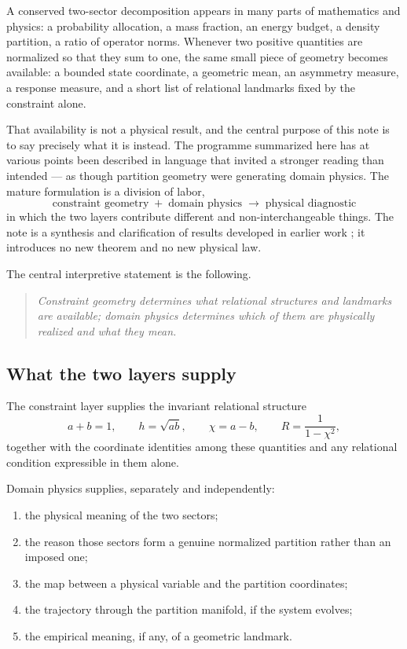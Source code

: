 \documentclass[11pt,a4paper]{article}
\theoremstyle{definition}
\theoremstyle{plain}
\theoremstyle{remark}
\newcommand{\Rresp}{R}
\begin{document}
A conserved two-sector decomposition appears in many parts of mathematics and
physics: a probability allocation, a mass fraction, an energy budget, a density
partition, a ratio of operator norms. Whenever two positive quantities are
normalized so that they sum to one, the same small piece of geometry becomes
available: a bounded state coordinate, a geometric mean, an asymmetry measure,
a response measure, and a short list of relational landmarks fixed by the
constraint alone.

That availability is not a physical result, and the central purpose of this
note is to say precisely what it is instead. The programme summarized here has
at various points been described in language that invited a stronger reading
than intended --- as though partition geometry were generating domain physics.
The mature formulation is a division of labor,
\begin{equation}
\boxed{\;
\text{constraint geometry}
\;+\;
\text{domain physics}
\;\longrightarrow\;
\text{physical diagnostic}\;}
\label{eq:architecture}
\end{equation}
in which the two layers contribute different and non-interchangeable things.
The note is a synthesis and clarification of results developed in earlier work
\cite{TwoFace,EffPot,Newtonian2Body,IntrinsicCubic,CubicThreshold,ReverseThales};
it introduces no new theorem and no new physical law.

The central interpretive statement is the following.

\begin{quote}
\emph{Constraint geometry determines what relational structures and landmarks
are available; domain physics determines which of them are physically realized
and what they mean.}
\end{quote}

\subsection{What the two layers supply}

The constraint layer supplies the invariant relational structure
\begin{equation}
a+b=1,\qquad
h=\sqrt{ab},\qquad
\chi=a-b,\qquad
\Rresp=\frac{1}{1-\chi^{2}} ,
\label{eq:coords}
\end{equation}
together with the coordinate identities among these quantities and any
relational condition expressible in them alone.

Domain physics supplies, separately and independently:
\begin{enumerate}[label=(\roman*),leftmargin=*]
\item the physical meaning of the two sectors;
\item the reason those sectors form a genuine normalized partition rather than
      an imposed one;
\item the map between a physical variable and the partition coordinates;
\item the trajectory through the partition manifold, if the system evolves;
\item the empirical meaning, if any, of a geometric landmark.
\end{enumerate}
\end{document}
